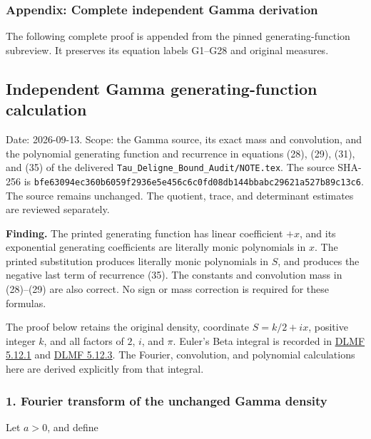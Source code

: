 \subsubsection{Appendix: Complete independent Gamma derivation}\label{endpoint-gamma_review--appendix-complete-independent-gamma-derivation}

The following complete proof is appended from the pinned generating-function subreview. It preserves its equation labels G1--G28 and original measures.

\subsection{Independent Gamma generating-function calculation}\label{endpoint-gamma_review--independent-gamma-generating-function-calculation}

Date: 2026-09-13. Scope: the Gamma source, its exact mass and convolution, and the polynomial generating function and recurrence in equations (28), (29), (31), and (35) of the delivered \nolinkurl{Tau_Deligne_Bound_Audit/NOTE.tex}. The source SHA-256 is \nolinkurl{bfe63094ec360b6059f2936e5e456c6c0fd08db144bbabc29621a527b89c13c6}. The source remains unchanged. The quotient, trace, and determinant estimates are reviewed separately.

\textbf{Finding.} The printed generating function has linear coefficient \(+x\), and its exponential generating coefficients are literally monic polynomials in \(x\). The printed substitution produces literally monic polynomials in \(S\), and produces the negative last term of recurrence (35). The constants and convolution mass in (28)--(29) are also correct. No sign or mass correction is required for these formulas.

The proof below retains the original density, coordinate \(S=k/2+ix\), positive integer \(k\), and all factors of \(2\), \(i\), and \(\pi\). Euler's Beta integral is recorded in \href{https://dlmf.nist.gov/5.12.E1}{DLMF 5.12.1} and \href{https://dlmf.nist.gov/5.12.E3}{DLMF 5.12.3}. The Fourier, convolution, and polynomial calculations here are derived explicitly from that integral.

\subsubsection{1. Fourier transform of the unchanged Gamma density}\label{endpoint-gamma_review--fourier-transform-of-the-unchanged-gamma-density}

Let \(a>0\), and define

